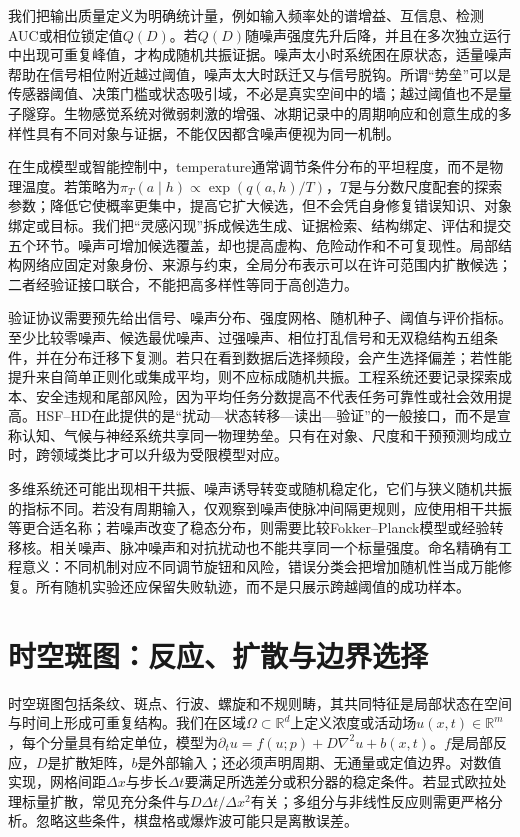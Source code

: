 我们把输出质量定义为明确统计量，例如输入频率处的谱增益、互信息、检测AUC或相位锁定值$Q(D)$。若$Q(D)$随噪声强度先升后降，并且在多次独立运行中出现可重复峰值，才构成随机共振证据。噪声太小时系统困在原状态，适量噪声帮助在信号相位附近越过阈值，噪声太大时跃迁又与信号脱钩。所谓“势垒”可以是传感器阈值、决策门槛或状态吸引域，不必是真实空间中的墙；越过阈值也不是量子隧穿。生物感觉系统对微弱刺激的增强、冰期记录中的周期响应和创意生成的多样性具有不同对象与证据，不能仅因都含噪声便视为同一机制。

在生成模型或智能控制中，temperature通常调节条件分布的平坦程度，而不是物理温度。若策略为$\pi_T(a\mid h)\propto\exp(q(a,h)/T)$，$T$是与分数尺度配套的探索参数；降低它使概率更集中，提高它扩大候选，但不会凭自身修复错误知识、对象绑定或目标。我们把“灵感闪现”拆成候选生成、证据检索、结构绑定、评估和提交五个环节。噪声可增加候选覆盖，却也提高虚构、危险动作和不可复现性。局部结构网络应固定对象身份、来源与约束，全局分布表示可以在许可范围内扩散候选；二者经验证接口联合，不能把高多样性等同于高创造力。

验证协议需要预先给出信号、噪声分布、强度网格、随机种子、阈值与评价指标。至少比较零噪声、候选最优噪声、过强噪声、相位打乱信号和无双稳结构五组条件，并在分布迁移下复测。若只在看到数据后选择频段，会产生选择偏差；若性能提升来自简单正则化或集成平均，则不应标成随机共振。工程系统还要记录探索成本、安全违规和尾部风险，因为平均任务分数提高不代表任务可靠性或社会效用提高。HSF--HD在此提供的是“扰动—状态转移—读出—验证”的一般接口，而不是宣称认知、气候与神经系统共享同一物理势垒。只有在对象、尺度和干预预测均成立时，跨领域类比才可以升级为受限模型对应。

多维系统还可能出现相干共振、噪声诱导转变或随机稳定化，它们与狭义随机共振的指标不同。若没有周期输入，仅观察到噪声使脉冲间隔更规则，应使用相干共振等更合适名称；若噪声改变了稳态分布，则需要比较Fokker--Planck模型或经验转移核。相关噪声、脉冲噪声和对抗扰动也不能共享同一个标量强度。命名精确有工程意义：不同机制对应不同调节旋钮和风险，错误分类会把增加随机性当成万能修复。所有随机实验还应保留失败轨迹，而不是只展示跨越阈值的成功样本。

\section{时空斑图：反应、扩散与边界选择}
\label{sec:emergence_patterns}

时空斑图包括条纹、斑点、行波、螺旋和不规则畴，其共同特征是局部状态在空间与时间上形成可重复结构。我们在区域$\Omega\subset\mathbb R^d$上定义浓度或活动场$u(x,t)\in\mathbb R^m$，每个分量具有给定单位，模型为$\partial_tu=f(u;p)+D\nabla^2u+b(x,t)$。$f$是局部反应，$D$是扩散矩阵，$b$是外部输入；还必须声明周期、无通量或定值边界。对数值实现，网格间距$\Delta x$与步长$\Delta t$要满足所选差分或积分器的稳定条件。若显式欧拉处理标量扩散，常见充分条件与$D\Delta t/\Delta x^2$有关；多组分与非线性反应则需更严格分析。忽略这些条件，棋盘格或爆炸波可能只是离散误差。

